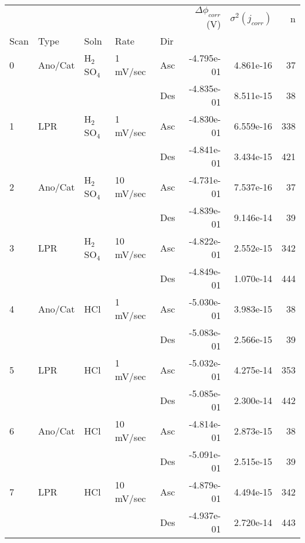 \begin{tabular}{lllllrrr}
\toprule
  &     &     &           &     &  $\Delta \phi_{corr}$ (V) &  $\sigma^2(j_{corr})$ &    n \\
Scan & Type & Soln & Rate & Dir &                           &                       &      \\
\midrule
0 & Ano/Cat & H$_2$SO$_4$ & 1 mV/sec & Asc &                -4.795e-01 &             4.861e-16 &   37 \\
  &     &     &           & Des &                -4.835e-01 &             8.511e-15 &   38 \\
1 & LPR & H$_2$SO$_4$ & 1 mV/sec & Asc &                -4.830e-01 &             6.559e-16 &  338 \\
  &     &     &           & Des &                -4.841e-01 &             3.434e-15 &  421 \\
2 & Ano/Cat & H$_2$SO$_4$ & 10 mV/sec & Asc &                -4.731e-01 &             7.537e-16 &   37 \\
  &     &     &           & Des &                -4.839e-01 &             9.146e-14 &   39 \\
3 & LPR & H$_2$SO$_4$ & 10 mV/sec & Asc &                -4.822e-01 &             2.552e-15 &  342 \\
  &     &     &           & Des &                -4.849e-01 &             1.070e-14 &  444 \\
4 & Ano/Cat & HCl & 1 mV/sec & Asc &                -5.030e-01 &             3.983e-15 &   38 \\
  &     &     &           & Des &                -5.083e-01 &             2.566e-15 &   39 \\
5 & LPR & HCl & 1 mV/sec & Asc &                -5.032e-01 &             4.275e-14 &  353 \\
  &     &     &           & Des &                -5.085e-01 &             2.300e-14 &  442 \\
6 & Ano/Cat & HCl & 10 mV/sec & Asc &                -4.814e-01 &             2.873e-15 &   38 \\
  &     &     &           & Des &                -5.091e-01 &             2.515e-15 &   39 \\
7 & LPR & HCl & 10 mV/sec & Asc &                -4.879e-01 &             4.494e-15 &  342 \\
  &     &     &           & Des &                -4.937e-01 &             2.720e-14 &  443 \\
\bottomrule
\end{tabular}
